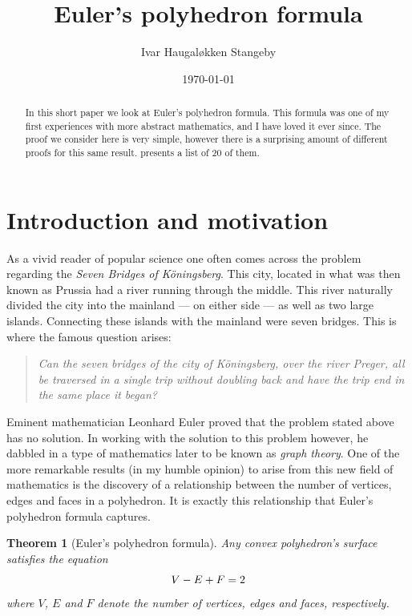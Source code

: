 \documentclass{amsart}
\title{Euler's polyhedron formula}
\author{Ivar Haugal{\o}kken Stangeby}
\date{\today}
\theoremstyle{plain}
\newtheorem{theorem}{Theorem}
\theoremstyle{definition}
\begin{document}
\begin{abstract}
   In this short paper we look at Euler's polyhedron formula. This formula was
   one of my first experiences with more abstract mathematics, and I have loved
   it ever since. The proof we consider here is very simple, however there is a
   surprising amount of different proofs for this same result. \cite{proofs}
   presents a list of 20 of them.
\end{abstract}
\maketitle

\tableofcontents

\section{Introduction and motivation}
\label{sec:introduction_and_motivation}

As a vivid reader of popular science one often comes across the problem
regarding the \emph{Seven Bridges of K{\"o}ningsberg}. This city, located in
what was then known as Prussia had a river running through the middle. This
river naturally divided the city into the mainland --- on either side --- as
well as two large islands. Connecting these islands with the mainland were
seven bridges. This is where the famous question arises:

\begin{quote}
    \emph{Can the seven bridges of the city of K{\"o}ningsberg, over the river
    Preger, all be traversed in a single trip without doubling back and have
the trip end in the same place it began?}  
\end{quote}

Eminent mathematician Leonhard Euler proved that the problem stated above has
no solution. In working with the solution to this problem however, he dabbled
in a type of mathematics later to be known as \emph{graph theory}. One of the
more remarkable results (in my humble opinion) to arise from this new field of
mathematics is the discovery of a relationship between the number of vertices,
edges and faces in a polyhedron. It is exactly this relationship that Euler's
polyhedron formula captures.

\begin{theorem}[Euler's polyhedron formula]
    Any convex polyhedron's surface satisfies the equation
    \begin{equation}
        \notag
        V - E + F = 2
    \end{equation}
    where $V$, $E$ and $F$ denote the number of vertices, edges and faces,
    respectively.
\end{theorem}
\end{document}
